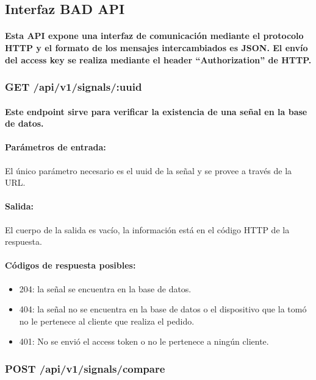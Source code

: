 \documentclass{article}
\begin{document}
\subsection{Interfaz BAD API}
\paragraph{
Esta API expone una interfaz de comunicación mediante el protocolo HTTP y el formato de los mensajes intercambiados es JSON. El envío del access key se realiza mediante el header “Authorization” de HTTP.
}
\subsubsection{GET /api/v1/signals/:uuid}
\paragraph{
Este endpoint sirve para verificar la existencia de una señal en la base de datos.
}

\paragraph{
Parámetros de entrada:}
El único parámetro necesario es el uuid de la señal y se provee a través de la URL.
\paragraph{
Salida:}
El cuerpo de la salida es vacío, la información está en el código HTTP de la respuesta.

\paragraph{
Códigos de respuesta posibles:
}
\begin{itemize}
    \item 204: la señal se encuentra en la base de datos.
    \item 404: la señal no se encuentra en la base de datos o el dispositivo que la tomó no le pertenece al cliente que realiza el pedido.
    \item 401: No se envió el access token o no le pertenece a ningún cliente.
\end{itemize}

\subsubsection{POST /api/v1/signals/compare}
\end{document}
